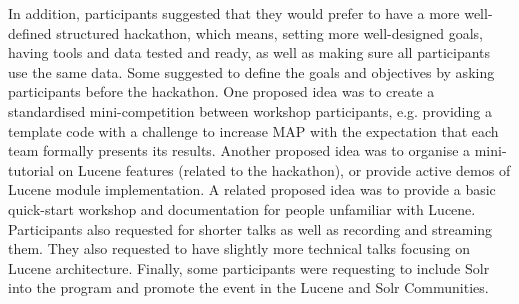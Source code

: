 In addition, participants suggested that they would prefer to have a more well-defined structured hackathon, which means, setting more well-designed goals, having tools and data tested and ready, as well as making sure all participants use the same data. 
Some suggested to define the goals and objectives by asking participants before the hackathon. 
One proposed idea was to create a standardised mini-competition between workshop participants, e.g. providing a template code with a challenge to increase MAP with the expectation that each team formally presents its results.
Another proposed idea was to organise a mini-tutorial on Lucene features (related to the hackathon), or provide active demos of Lucene module implementation. 
A related proposed idea was to provide a basic quick-start workshop and documentation for people unfamiliar with Lucene. 
Participants also requested for shorter talks as well as recording and streaming them. 
They also requested to have slightly more technical talks focusing on Lucene architecture. 
Finally, some participants were requesting to include Solr into the program and promote the event in the Lucene and Solr Communities.


